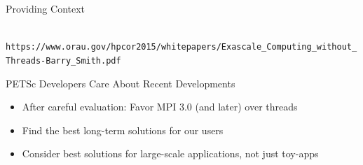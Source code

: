 

\begin{frame}{Providing Context}

 \begin{center}
   \\
  {\scriptsize \texttt{https://www.orau.gov/hpcor2015/whitepapers/Exascale\_Computing\_without\_Threads-Barry\_Smith.pdf}}
 \end{center}

 \begin{block}{PETSc Developers Care About Recent Developments}
  \begin{itemize}
   \item After careful evaluation: Favor MPI 3.0 (and later) over threads
   \item Find the best long-term solutions for our users
   \item Consider best solutions for large-scale applications, not just toy-apps
  \end{itemize}
 \end{block}

\end{frame}



